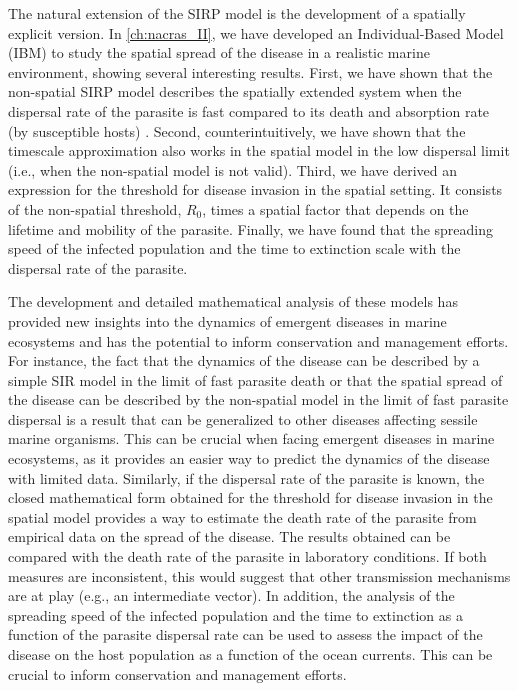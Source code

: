 The natural extension of the SIRP model is the development of a spatially
explicit version. In \cref{ch:nacras_II}, we have developed an Individual-Based
Model (IBM) to study the spatial spread of the disease in a realistic marine
environment, showing several interesting results. First, we have shown that the
non-spatial SIRP model describes the spatially extended system when the
dispersal rate of the parasite is fast compared to its death and absorption
rate (by susceptible hosts) \cite{GimenezRomero_2022_RSos}. Second,
counterintuitively, we have shown that the timescale approximation also works
in the spatial model in the low dispersal limit (i.e., when the non-spatial
model is not valid). Third, we have derived an expression for the threshold for
disease invasion in the spatial setting. It consists of the non-spatial
threshold, $R_0$, times a spatial factor that depends on the lifetime and
mobility of the parasite. Finally, we have found that the spreading speed of
the infected population and the time to extinction scale with the dispersal
rate of the parasite.

The development and detailed mathematical analysis of these models has provided
new insights into the dynamics of emergent diseases in marine ecosystems and
has the potential to inform conservation and management efforts. For instance,
the fact that the dynamics of the disease can be described by a simple SIR
model in the limit of fast parasite death or that the spatial spread of
the disease can be described by the non-spatial model in the limit of fast
parasite dispersal is a result that can be generalized to other diseases
affecting sessile marine organisms. This can be crucial when facing emergent
diseases in marine ecosystems, as it provides an easier way to predict the
dynamics of the disease with limited data. Similarly, if the dispersal rate of
the parasite is known, the closed mathematical form obtained for the threshold
for disease invasion in the spatial model provides a way to estimate the death
rate of the parasite from empirical data on the spread of the disease.
The results obtained can be compared with the death rate of the parasite in
laboratory conditions. If both measures are inconsistent, this would suggest
that other transmission mechanisms are at play (e.g., an intermediate vector).
In addition, the analysis of the spreading speed of the infected population and
the time to extinction as a function of the parasite dispersal rate can be used
to assess the impact of the disease on the host population as a function of the
ocean currents. This can be crucial to inform conservation and management
efforts.

